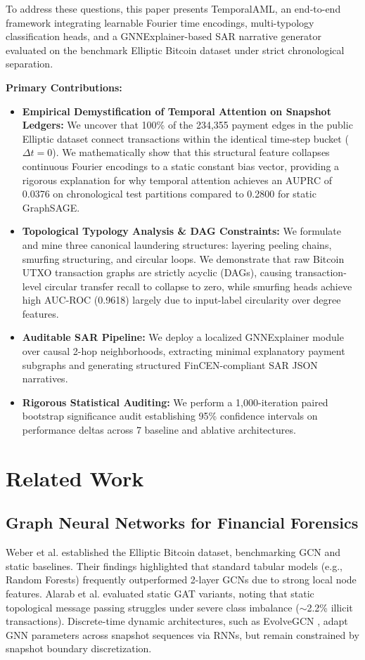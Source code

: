 \documentclass[conference]{IEEEtran}
\begin{document}
To address these questions, this paper presents TemporalAML, an end-to-end framework integrating learnable Fourier time encodings, multi-typology classification heads, and a GNNExplainer-based SAR narrative generator evaluated on the benchmark Elliptic Bitcoin dataset under strict chronological separation. 

\textbf{Primary Contributions:}
\begin{itemize}
    \item \textbf{Empirical Demystification of Temporal Attention on Snapshot Ledgers:} We uncover that 100\% of the 234,355 payment edges in the public Elliptic dataset connect transactions within the identical time-step bucket ($\Delta t = 0$). We mathematically show that this structural feature collapses continuous Fourier encodings to a static constant bias vector, providing a rigorous explanation for why temporal attention achieves an AUPRC of 0.0376 on chronological test partitions compared to 0.2800 for static GraphSAGE.
    \item \textbf{Topological Typology Analysis \& DAG Constraints:} We formulate and mine three canonical laundering structures: layering peeling chains, smurfing structuring, and circular loops. We demonstrate that raw Bitcoin UTXO transaction graphs are strictly acyclic (DAGs), causing transaction-level circular transfer recall to collapse to zero, while smurfing heads achieve high AUC-ROC (0.9618) largely due to input-label circularity over degree features.
    \item \textbf{Auditable SAR Pipeline:} We deploy a localized GNNExplainer module over causal 2-hop neighborhoods, extracting minimal explanatory payment subgraphs and generating structured FinCEN-compliant SAR JSON narratives.
    \item \textbf{Rigorous Statistical Auditing:} We perform a 1,000-iteration paired bootstrap significance audit establishing 95\% confidence intervals on performance deltas across 7 baseline and ablative architectures.
\end{itemize}

\section{Related Work}

\subsection{Graph Neural Networks for Financial Forensics}
Weber et al. \cite{weber2019elliptic} established the Elliptic Bitcoin dataset, benchmarking GCN and static baselines. Their findings highlighted that standard tabular models (e.g., Random Forests) frequently outperformed 2-layer GCNs due to strong local node features. Alarab et al. \cite{alarab2020competence} evaluated static GAT \cite{velivckovic2018gat} variants, noting that static topological message passing struggles under severe class imbalance ($\sim$2.2\% illicit transactions). Discrete-time dynamic architectures, such as EvolveGCN \cite{pareja2020evolvegcn}, adapt GNN parameters across snapshot sequences via RNNs, but remain constrained by snapshot boundary discretization.
\end{document}
